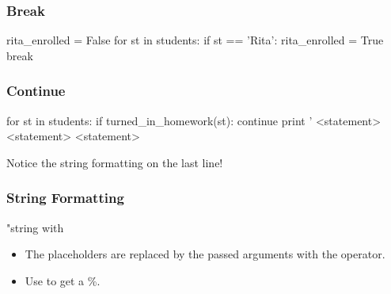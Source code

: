 \begin{frame}[fragile]
\frametitle{Break}
\begin{python}
rita_enrolled = False
for st in students:
    if st == 'Rita':
        rita_enrolled = True
        break
\end{python}

\end{frame}

\begin{frame}[fragile]
\frametitle{Continue}
\begin{python}
for st in students:
    if turned_in_homework(st):
        continue
    print '%
    <statement>
    <statement>
    <statement>
\end{python}

Notice the string formatting on the last line!
\end{frame}

\begin{frame}[fragile]
\frametitle{String Formatting}
\begin{python}
"string with %
\end{python}

\begin{itemize}
\item The  placeholders are replaced by the passed arguments with the \code{\%} operator.
\item Use \code{\%\%} to get a \%.
\end{itemize}

\end{frame}


